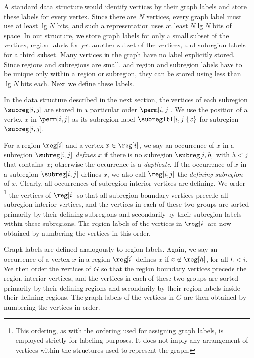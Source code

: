 A standard data structure would identify vertices by their graph labels and
store these labels for every vertex.
Since there are $N$ vertices, every graph label must use at least
$\lg N$ bits, and such a representation uses at least $N \lg N$ bits of space.
In our structure, we store graph labels for only a small subset of the vertices, 
region labels for yet another subset of the vertices, and subregion labels for 
a third subset. 
Many vertices in the graph have no label explicitly stored.
Since regions and subregions are small, and region and subregion labels have to
be unique only within a region or subregion, they can be stored using
less than $\lg N$ bits each.
Next we define these labels.

In the data structure described in the next section, the vertices of
each subregion $\subreg[i,j]$ are stored in a particular order $\perm[i,j]$.
We use the position of a vertex $x$ in $\perm[i,j]$ as its
subregion label $\subreglbl[i,j]{x}$ for subregion~$\subreg[i,j]$.

For a region $\reg[i]$ and a vertex $x \in \reg[i]$, we say an occurrence of
$x$ in a subregion $\subreg[i,j]$ \emph{defines} $x$ if there is no
subregion $\subreg[i,h]$ with $h < j$ that contains~$x$; otherwise the
occurrence is a \emph{duplicate}.
If the occurrence of $x$ in a subregion $\subreg[i,j]$ defines $x$, we also call
$\reg[i,j]$ the \emph{defining subregion} of $x$.
Clearly, all occurrences of subregion interior vertices are
defining.
We order \footnote{This ordering, as with the ordering used for assigning 
graph labels, is employed strictly for labeling purposes. It does not imply
any arrangement of vertices within the structures used to represent the graph.}
the vertices of $\reg[i]$ so that all subregion boundary vertices
precede all subregion-interior vertices, and the vertices in each of these two
groups are sorted primarily by their defining subregions and secondarily by
their subregion labels within these subregions.
The region labels of the vertices in $\reg[i]$ are now obtained by numbering the
vertices in this order.


Graph labels are defined analogously to region labels.
Again, we say an occurrence of a vertex $x$ in a region $\reg[i]$ defines
$x$ if $x \not\in \reg[h]$, for all $h < i$.
We then order the vertices of $G$ so that the region boundary vertices precede
the region-interior vertices, and the vertices in each of these two groups are
sorted primarily by their defining regions and secondarily by their region
labels inside their defining regions.
The graph labels of the vertices in $G$ are
then obtained by numbering the vertices in order.

